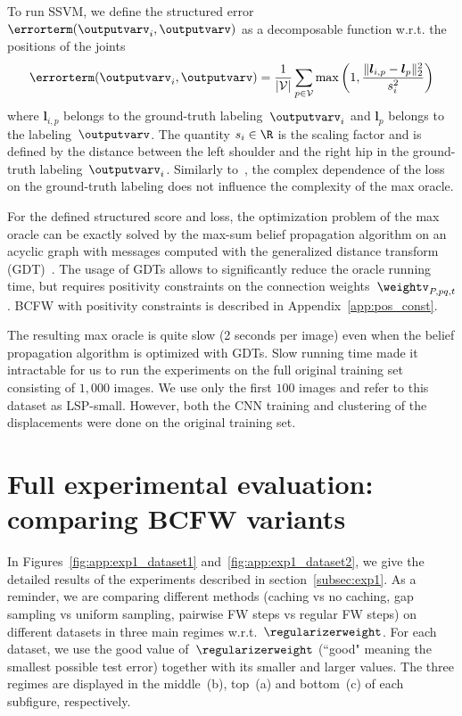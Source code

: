\documentclass{article}
\begin{document}
To run SSVM, we define the structured error $\errorterm(\outputvarv_i,\outputvarv)$ as a decomposable function w.r.t. the positions of the joints
\begin{equation*}
\errorterm(\outputvarv_i,\outputvarv) = \frac{1}{|\mathcal{V}|}\sum_{p \in \mathcal{V}} \max \left(1,\frac{\Vert \bm{l}_{i,p}-\bm{l}_{p}\Vert_2^2}{s_i^2}\right)
\end{equation*}
where $\bm{l}_{i,p}$ belongs to the ground-truth labeling~$\outputvarv_i$ and $\bm{l}_{p}$ belongs to the labeling~$\outputvarv$.
The quantity $s_i\in\R$ is the scaling factor and is defined by the distance between the left shoulder and the right hip in the ground-truth labeling~$\outputvarv_i$.
Similarly to~, the complex dependence of the loss on the ground-truth labeling does not influence the complexity of the max oracle.

For the defined structured score and loss, the optimization problem of the max oracle can be exactly solved by the max-sum belief propagation algorithm on an acyclic graph with messages computed with the generalized distance transform (GDT)~\cite{felzenszwalb2005distTrans}.
The usage of GDTs allows to significantly reduce the oracle running time, but requires positivity constraints on the connection weights~$\weightv_{P,pq, t}$.
BCFW with positivity constraints is described in Appendix~\ref{app:pos_const}.

The resulting max oracle is quite slow (2 seconds per image) even when the belief propagation algorithm is optimized with GDTs.
Slow running time made it intractable for us to run the experiments on the full original training set consisting of $1,000$ images.
We use only the first $100$ images and refer to this dataset as LSP-small. However, both the CNN training and clustering of the displacements were done on the original training set.



%
%

\newpage

%
\section{Full experimental evaluation: comparing BCFW variants}
\label{app:exp1}
In Figures~\ref{fig:app:exp1_dataset1} and~\ref{fig:app:exp1_dataset2}, we give the detailed results of the experiments described in section~\ref{subsec:exp1}.
As a reminder, we are comparing different methods (caching vs no caching, gap sampling vs uniform sampling, pairwise FW steps vs regular FW steps) on different datasets in three main regimes w.r.t.~$\regularizerweight$.
For each dataset, we use the good value of~$\regularizerweight$ (``good" meaning the smallest possible test error) together with its smaller and larger values.
The three regimes are displayed in the middle~(b), top~(a) and bottom~(c) of each subfigure, respectively.
\end{document}
